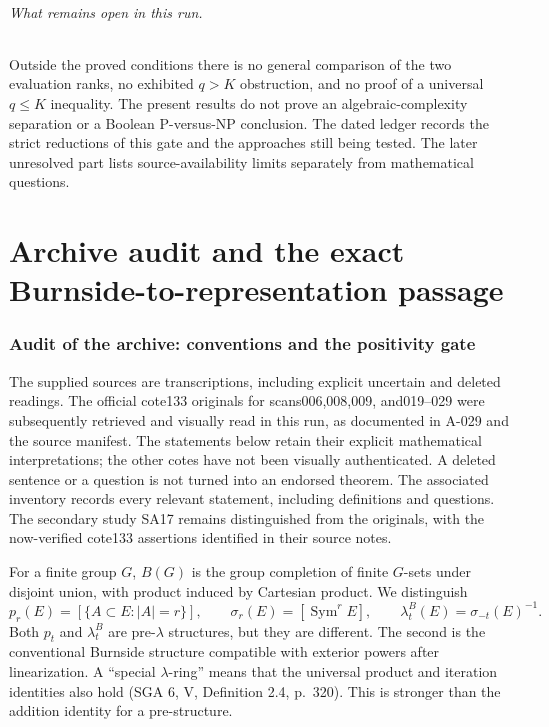 \documentclass[11pt]{article}
\begin{document}
\paragraph{What remains open in this run.}
Outside the proved conditions there is no general comparison
of the two evaluation ranks, no exhibited \(q>K\) obstruction,
and no proof of a universal \(q\leq K\) inequality. The present
results do not prove an algebraic-complexity separation or a
Boolean P-versus-NP conclusion. The dated ledger records the
strict reductions of this gate and the approaches still being
tested. The later unresolved part lists source-availability
limits separately from mathematical questions.
\clearpage

\part{Archive audit and the exact Burnside-to-representation passage}

\section{Audit of the archive: conventions and the positivity gate}
The supplied sources are transcriptions, including explicit uncertain and
deleted readings. The official cote133 originals for scans006,008,009,
and019--029 were subsequently retrieved and visually read in this run,
as documented in A-029 and the source manifest. The statements below
retain their explicit mathematical interpretations; the other cotes
have not been visually authenticated. A deleted sentence or a question
is not turned into an endorsed theorem. The associated inventory records
every relevant statement, including definitions and questions.
The secondary study SA17 remains distinguished from the originals,
with the now-verified cote133 assertions identified in their source notes.

For a finite group $G$, $B(G)$ is the group completion of finite $G$-sets under
disjoint union, with product induced by Cartesian product.  We distinguish
\[
 p_r(E)=[\{A\subset E:|A|=r\}],\qquad
 \sigma_r(E)=[\operatorname{Sym}^rE],\qquad
 \lambda_t^B(E)=\sigma_{-t}(E)^{-1}.
\]
Both $p_t$ and $\lambda_t^B$ are pre-$\lambda$ structures, but they are different.
The second is the conventional Burnside structure compatible with exterior
powers after linearization.  A ``special $\lambda$-ring'' means that the
universal product and iteration identities also hold (SGA 6, V, Definition
2.4, p.~320).  This is stronger than the addition identity for a pre-structure.
\end{document}
